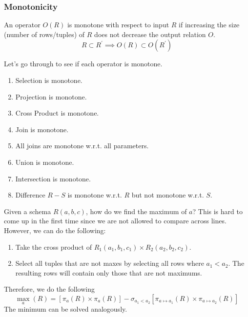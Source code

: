 \documentclass{article}
\begin{document}
    \subsubsection{Monotonicity}
      
      \begin{definition}
        An operator $O(R)$ is monotone with respect to input $R$ if increasing the size (number of rows/tuples) of $R$ does not decrease the output relation $O$.  
        \begin{equation}
          R \subset R^\prime \implies O(R) \subset O(R^\prime)
        \end{equation}
      \end{definition}

      \begin{example}
        Let's go through to see if each operator is monotone. 
        \begin{enumerate}
          \item Selection is monotone. 
          \item Projection is monotone. 
          \item Cross Product is monotone. 
          \item Join is monotone. 
          \item All joins are monotone w.r.t. all parameters. 
          \item Union is monotone. 
          \item Intersection is monotone. 
          \item Difference $R - S$ is monotone w.r.t. $R$ but not monotone w.r.t. $S$.
        \end{enumerate}
      \end{example}

      \begin{example}
        Given a schema $R(a, b, c)$, how do we find the maximum of $a$? This is hard to come up in the first time since we are not allowed to compare across lines. However, we can do the following: 
        \begin{enumerate}
          \item Take the cross product of $R_1 (a_1, b_1, c_1) \times R_2 (a_2, b_2, c_2)$. 
          \item Select all tuples that are not maxes by selecting all rows where $a_1 < a_2$. The resulting rows will contain only those that are not maximums. 
        \end{enumerate}
        Therefore, we do the following 
        \begin{equation}
          \max_a (R) = [\pi_a (R) \times \pi_a (R)] - \sigma_{a_1 < a_2} [\pi_{a \mapsto a_1} (R) \times \pi_{a \mapsto a_2} (R)]
        \end{equation}
        The minimum can be solved analogously. 
      \end{example}
\end{document}
